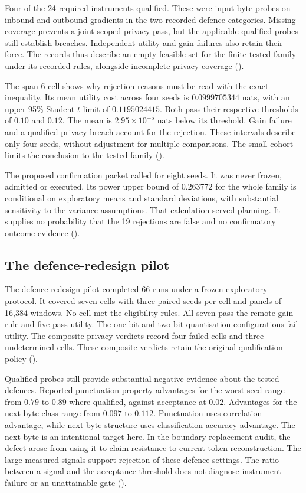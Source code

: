 Four of the 24 required instruments qualified. These were input byte
probes on inbound and outbound gradients in the two recorded defence
categories. Missing coverage prevents a joint scoped privacy pass, but
the applicable qualified probes still establish breaches. Independent
utility and gain failures also retain their force. The records thus
describe an empty feasible set for the finite tested family under its
recorded rules, alongside incomplete privacy coverage ().

The span-6 cell shows why rejection reasons must be read with the exact
inequality. Its mean utility cost across four seeds is $0.0999705344$
nats, with an upper 95\% Student $t$ limit of $0.1195024415$.
Both pass their respective thresholds of $0.10$ and $0.12$. The mean is
$2.95\times10^{-5}$ nats below its threshold. Gain failure and a qualified
privacy breach account for the rejection. These intervals describe only
four seeds, without adjustment for multiple comparisons. The small cohort
limits the conclusion to the tested family ().

The proposed confirmation packet called for eight seeds. It was never
frozen, admitted or executed. Its power upper bound of $0.263772$ for the
whole family is conditional on exploratory means and standard deviations,
with substantial sensitivity to the variance assumptions. That calculation
served planning. It supplies no probability that the 19 rejections are
false and no confirmatory outcome evidence ().

\subsection{The defence-redesign pilot}
\label{sec:f4}

The defence-redesign pilot completed 66 runs under a frozen exploratory
protocol. It covered seven cells with three paired seeds per cell and
panels of 16,384 windows. No cell met the eligibility rules. All seven
pass the remote gain rule and five pass utility. The one-bit and two-bit
quantisation configurations fail utility. The composite privacy verdicts record four failed cells
and three undetermined cells. These composite verdicts retain the original
qualification policy ().

Qualified probes still provide substantial negative evidence about the
tested defences. Reported punctuation property advantages for the worst
seed range from $0.79$ to $0.89$ where qualified, against acceptance at
$0.02$. Advantages for the next byte class range from $0.097$ to $0.112$.
Punctuation uses correlation advantage, while next byte structure uses
classification accuracy advantage. The next byte is an intentional target
here. In the boundary-replacement audit, the defect arose from using it
to claim resistance to current token reconstruction. The large measured
signals support rejection of these defence settings. The ratio between a
signal and the acceptance threshold does not diagnose instrument failure
or an unattainable gate ().

